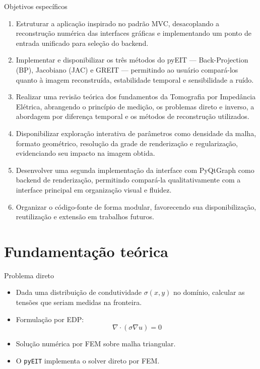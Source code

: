 \documentclass[aspectratio=169]{beamer}
\begin{document}
\begin{frame}{Objetivos específicos}
\vspace{-0.6em}
\begin{tcolorbox}[ufabcbox,title=Objetivos específicos]
\footnotesize
\begin{enumerate}\setlength{\itemsep}{2pt}\setlength{\parskip}{0pt}\setlength{\topsep}{2pt}
  \item Estruturar a aplicação inspirado no padrão MVC, desacoplando a reconstrução numérica das interfaces gráficas e implementando um ponto de entrada unificado para seleção do backend.
  \item Implementar e disponibilizar os três métodos do pyEIT --- Back-Projection (BP), Jacobiano (JAC) e GREIT --- permitindo ao usuário compará-los quanto à imagem reconstruída, estabilidade temporal e sensibilidade a ruído.
  \item Realizar uma revisão teórica dos fundamentos da Tomografia por Impedância Elétrica, abrangendo o princípio de medição, os problemas direto e inverso, a abordagem por diferença temporal e os métodos de reconstrução utilizados.
  \item Disponibilizar exploração interativa de parâmetros como densidade da malha, formato geométrico, resolução da grade de renderização e regularização, evidenciando seu impacto na imagem obtida.
  \item Desenvolver uma segunda implementação da interface com PyQtGraph como backend de renderização, permitindo compará-la qualitativamente com a interface principal em organização visual e fluidez.
  \item Organizar o código-fonte de forma modular, favorecendo sua disponibilização, reutilização e extensão em trabalhos futuros.
\end{enumerate}
\end{tcolorbox}
\end{frame}

\section{Fundamentação teórica}

\begin{frame}{Problema direto}
\begin{tcolorbox}[ufabcbox,title=Formulação]
\footnotesize
\begin{itemize}\setlength{\itemsep}{2pt}\setlength{\parskip}{0pt}\setlength{\topsep}{2pt}
  \item Dada uma distribuição de condutividade $\sigma(x,y)$ no domínio, calcular as tensões que seriam medidas na fronteira.
  \item Formulação por EDP:
  \[
  \nabla \cdot (\sigma \nabla u) = 0
  \]
  \item Solução numérica por FEM sobre malha triangular.
  \item O \texttt{pyEIT} implementa o solver direto por FEM.
\end{itemize}
\end{tcolorbox}

\end{frame}
\end{document}
